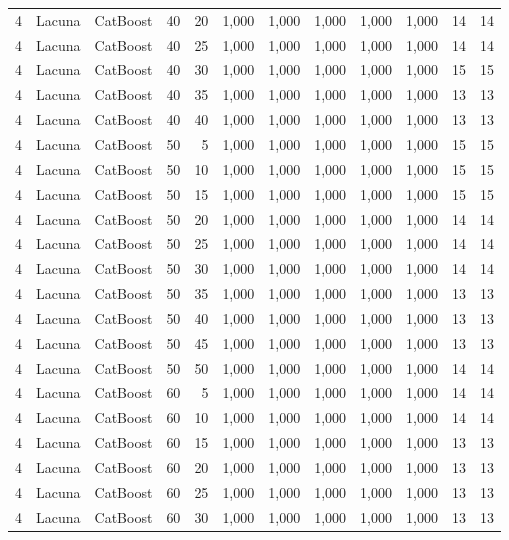 \begin{longtable}{@{}rllrrrrrrrrr@{}}
4 & Lacuna & CatBoost & 40 & 20 & 1,000 & 1,000 & 1,000 & 1,000 & 1,000 & 14 & 14 \\
4 & Lacuna & CatBoost & 40 & 25 & 1,000 & 1,000 & 1,000 & 1,000 & 1,000 & 14 & 14 \\
4 & Lacuna & CatBoost & 40 & 30 & 1,000 & 1,000 & 1,000 & 1,000 & 1,000 & 15 & 15 \\
4 & Lacuna & CatBoost & 40 & 35 & 1,000 & 1,000 & 1,000 & 1,000 & 1,000 & 13 & 13 \\
4 & Lacuna & CatBoost & 40 & 40 & 1,000 & 1,000 & 1,000 & 1,000 & 1,000 & 13 & 13 \\
4 & Lacuna & CatBoost & 50 & 5 & 1,000 & 1,000 & 1,000 & 1,000 & 1,000 & 15 & 15 \\
4 & Lacuna & CatBoost & 50 & 10 & 1,000 & 1,000 & 1,000 & 1,000 & 1,000 & 15 & 15 \\
4 & Lacuna & CatBoost & 50 & 15 & 1,000 & 1,000 & 1,000 & 1,000 & 1,000 & 15 & 15 \\
4 & Lacuna & CatBoost & 50 & 20 & 1,000 & 1,000 & 1,000 & 1,000 & 1,000 & 14 & 14 \\
4 & Lacuna & CatBoost & 50 & 25 & 1,000 & 1,000 & 1,000 & 1,000 & 1,000 & 14 & 14 \\
4 & Lacuna & CatBoost & 50 & 30 & 1,000 & 1,000 & 1,000 & 1,000 & 1,000 & 14 & 14 \\
4 & Lacuna & CatBoost & 50 & 35 & 1,000 & 1,000 & 1,000 & 1,000 & 1,000 & 13 & 13 \\
4 & Lacuna & CatBoost & 50 & 40 & 1,000 & 1,000 & 1,000 & 1,000 & 1,000 & 13 & 13 \\
4 & Lacuna & CatBoost & 50 & 45 & 1,000 & 1,000 & 1,000 & 1,000 & 1,000 & 13 & 13 \\
4 & Lacuna & CatBoost & 50 & 50 & 1,000 & 1,000 & 1,000 & 1,000 & 1,000 & 14 & 14 \\
4 & Lacuna & CatBoost & 60 & 5 & 1,000 & 1,000 & 1,000 & 1,000 & 1,000 & 14 & 14 \\
4 & Lacuna & CatBoost & 60 & 10 & 1,000 & 1,000 & 1,000 & 1,000 & 1,000 & 14 & 14 \\
4 & Lacuna & CatBoost & 60 & 15 & 1,000 & 1,000 & 1,000 & 1,000 & 1,000 & 13 & 13 \\
4 & Lacuna & CatBoost & 60 & 20 & 1,000 & 1,000 & 1,000 & 1,000 & 1,000 & 13 & 13 \\
4 & Lacuna & CatBoost & 60 & 25 & 1,000 & 1,000 & 1,000 & 1,000 & 1,000 & 13 & 13 \\
4 & Lacuna & CatBoost & 60 & 30 & 1,000 & 1,000 & 1,000 & 1,000 & 1,000 & 13 & 13 \\

\end{longtable}
